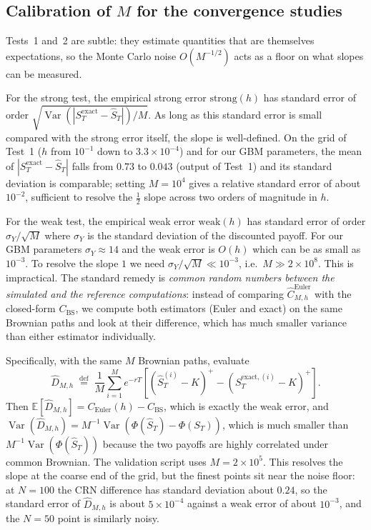 \documentclass[11pt,a4paper]{article}
\theoremstyle{plain}
\theoremstyle{definition}
\theoremstyle{remark}
\newcommand{\E}{\mathbb{E}}
\newcommand{\Var}{\operatorname{Var}}
\newcommand{\eqdef}{\overset{\mathrm{def}}{=}}
\begin{document}
\subsection{Calibration of $M$ for the convergence studies}

Tests~1 and~2 are subtle: they estimate quantities that are
themselves expectations, so the Monte Carlo noise $O(M^{-1/2})$ acts
as a floor on what slopes can be measured.

For the strong test, the empirical strong error
$\mathrm{strong}(h)$ has standard error of order
$\sqrt{\Var(|S_T^{\mathrm{exact}} - \hat S_T|) / M}$. As long as this
standard error is small compared with the strong error itself, the
slope is well-defined. On the grid of Test~1 ($h$ from $10^{-1}$ down
to $3.3 \times 10^{-4}$) and for our GBM parameters, the mean of
$|S_T^{\mathrm{exact}} - \hat S_T|$ falls from $0.73$ to $0.043$
(output of Test~1) and its standard deviation is comparable; setting
$M = 10^4$ gives a relative standard error of about $10^{-2}$, sufficient
to resolve the $\tfrac{1}{2}$ slope across two orders of magnitude in
$h$.

For the weak test, the empirical weak error
$\mathrm{weak}(h)$ has standard error of order $\sigma_Y / \sqrt{M}$
where $\sigma_Y$ is the standard deviation of the discounted payoff.
For our GBM parameters $\sigma_Y \approx 14$ and the weak error is
$O(h)$ which can be as small as $10^{-3}$. To resolve the slope $1$
we need
$\sigma_Y / \sqrt{M} \ll 10^{-3}$, i.e.\ $M \gg 2 \times 10^8$.
This is impractical. The standard remedy is \emph{common random
numbers between the simulated and the reference computations}: instead
of comparing $\hat C_{M, h}^{\mathrm{Euler}}$ with the closed-form
$C_{\mathrm{BS}}$, we compute both estimators (Euler and exact) on
the same Brownian paths and look at their difference, which has much
smaller variance than either estimator individually.

Specifically, with the same $M$ Brownian paths, evaluate
\begin{equation}
\hat D_{M, h} \;\eqdef\;
\frac{1}{M} \sum_{i=1}^{M} e^{-rT}
\left[ (\hat S_T^{(i)} - K)^+ - (S_T^{\mathrm{exact}, (i)} - K)^+ \right].
\end{equation}
Then $\E[\hat D_{M, h}] = C_{\mathrm{Euler}}(h) - C_{\mathrm{BS}}$,
which is exactly the weak error, and
$\Var(\hat D_{M, h}) = M^{-1} \Var(\Phi(\hat S_T) - \Phi(S_T))$,
which is much smaller than $M^{-1} \Var(\Phi(\hat S_T))$ because the
two payoffs are highly correlated under common Brownian. The
validation script uses $M = 2 \times 10^5$. This resolves the slope at
the coarse end of the grid, but the finest points sit near the noise
floor: at $N = 100$ the CRN difference has standard deviation about
$0.24$, so the standard error of $\hat D_{M, h}$ is about
$5 \times 10^{-4}$ against a weak error of about $10^{-3}$, and the
$N = 50$ point is similarly noisy.
\end{document}
